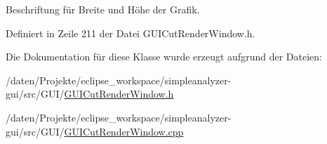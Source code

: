 Beschriftung für Breite und Höhe der Grafik. 



Definiert in Zeile 211 der Datei G\-U\-I\-Cut\-Render\-Window.\-h.



Die Dokumentation für diese Klasse wurde erzeugt aufgrund der Dateien\-:\begin{DoxyCompactItemize}
\item 
/daten/\-Projekte/eclipse\-\_\-workspace/simpleanalyzer-\/gui/src/\-G\-U\-I/\hyperlink{GUICutRenderWindow_8h}{G\-U\-I\-Cut\-Render\-Window.\-h}\item 
/daten/\-Projekte/eclipse\-\_\-workspace/simpleanalyzer-\/gui/src/\-G\-U\-I/\hyperlink{GUICutRenderWindow_8cpp}{G\-U\-I\-Cut\-Render\-Window.\-cpp}\end{DoxyCompactItemize}
